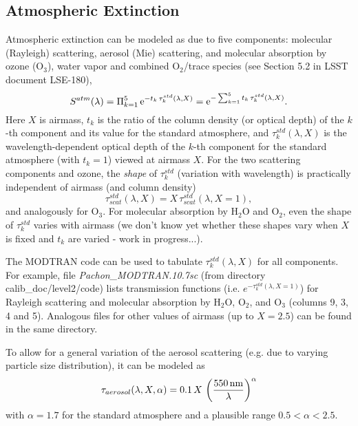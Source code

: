 \documentclass[12pt,preprint]{aastex}
\begin{document}
\subsection{Atmospheric Extinction} 

Atmospheric extinction can be modeled as due to five components: molecular (Rayleigh) scattering, 
aerosol (Mie) scattering, and molecular absorption by ozone (O$_3$), water vapor and combined
O$_2$/trace species (see Section 5.2 in LSST document LSE-180),
\begin{equation}
\label{eq:atmModel}
 S^{atm}(\lambda) = \Pi_{k=1}^5 \, {\rm e}^{- t_k \, \tau_k^{std}(\lambda, X)} 
                           =  {\rm e}^{-\sum_{k=1}^5  t_k \, \tau_k^{std}(\lambda, X)}. 
\end{equation}
Here $X$ is airmass, $t_k$ is the ratio of the column density (or optical depth) of the $k$-th 
component and its value for the standard atmosphere, and $\tau_k^{std}(\lambda, X)$ is the 
wavelength-dependent optical depth of the $k$-th component for the standard 
atmosphere (with $t_k=1$) viewed at airmass $X$. For the two scattering components and ozone, the {\it shape} of 
$\tau_k^{std}$ (variation with wavelength) is practically independent of airmass (and column
density) 
\begin{equation}
         \tau_{scat}^{std}(\lambda, X) = X \, \tau_{scat}^{std}(\lambda, X=1),
\end{equation}
and analogously for O$_3$. For molecular absorption by H$_2$O and O$_2$, even the 
shape of $\tau_k^{std}$ varies with airmass (we don't know yet whether these shapes
vary when $X$ is fixed and $t_k$ are varied - work in progress...). 

The MODTRAN code can be used to tabulate $\tau_k^{std}(\lambda, X)$ for all components. 
For example, file {\it Pachon\_MODTRAN.10.7sc}  (from directory calib\_doc/level2/code)
lists transmission functions (i.e. $e^{-\tau_k^{std}(\lambda, X=1)}$) for Rayleigh scattering  and 
molecular absorption by H$_2$O, O$_2$, and O$_3$ (columns 9, 3, 4 and 5). Analogous 
files for other values of airmass (up to $X=2.5$) can be found in the same directory.

To allow for a general variation of the aerosol scattering (e.g. due to varying particle 
size distribution), it can be modeled as 
\begin{equation}
      \tau_{aerosol}(\lambda, X, \alpha) = 0.1 \, X \, \left({550 \, {\rm nm} \over \lambda} \right)^\alpha
\end{equation}
with $\alpha=1.7$ for the standard atmosphere and a plausible range $0.5 < \alpha < 2.5$. 
\end{document}
